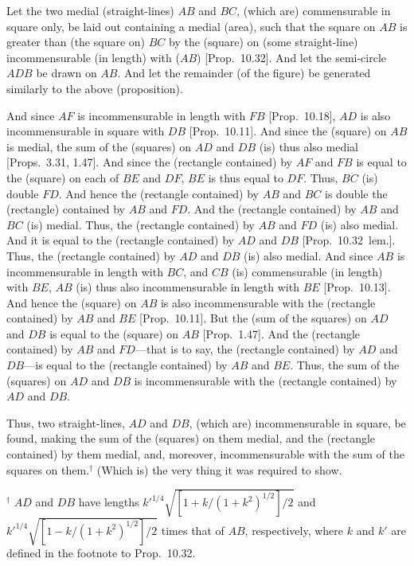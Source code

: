 \begin{Parallel}{}{}
{
\centerline{}

Let the two medial (straight-lines) $AB$ and $BC$, (which are) commensurable in square only, be laid out containing a medial (area), such
that the square on $AB$ is greater than (the square on) $BC$ by the
(square) on (some straight-line) incommensurable (in length) with ($AB$) [Prop.~10.32].  And let the semi-circle
$ADB$ be drawn on $AB$. And let the remainder (of the figure)
be generated similarly to the above (proposition).

And since $AF$ is incommensurable in length with $FB$ [Prop.~10.18], $AD$
is also incommensurable in square with $DB$ [Prop.~10.11]. And since the (square) on $AB$ is
medial, the sum of the (squares) on $AD$ and $DB$ (is) thus also
medial [Props.~3.31, 1.47]. And since the (rectangle
contained) by $AF$ and $FB$ is equal to the (square) on each of $BE$ and
$DF$, $BE$ is thus equal to $DF$. Thus, $BC$ (is) double $FD$. And
hence the (rectangle contained) by $AB$ and $BC$ is double the
(rectangle) contained by $AB$ and $FD$. And the (rectangle contained)
by $AB$ and $BC$ (is) medial. Thus, the (rectangle contained) by $AB$
and $FD$ (is) also medial. And it is equal to the (rectangle contained) 
by $AD$ and $DB$ [Prop.~10.32~lem.]. Thus, the
(rectangle contained) by $AD$ and $DB$ (is) also medial.
And since $AB$ is incommensurable in length with $BC$, and $CB$
(is) commensurable (in length) with $BE$, $AB$ (is) thus also incommensurable
in length with $BE$ [Prop.~10.13]. And hence the (square) on $AB$ is also incommensurable with the (rectangle contained) by $AB$ and $BE$ [Prop.~10.11]. But the (sum of the squares) on $AD$ and
$DB$ is equal to the (square) on $AB$ [Prop.~1.47].
And the (rectangle contained) by $AB$ and $FD$---that is to say, the (rectangle contained) by $AD$ and $DB$---is equal to the
(rectangle contained) by $AB$ and $BE$. Thus, the sum of the (squares) on
$AD$ and $DB$ is incommensurable with the (rectangle contained) by
$AD$ and $DB$.

Thus, two straight-lines, $AD$ and $DB$, (which are) incommensurable
in square, be found, making the sum of the (squares) on them
medial, and the (rectangle contained) by them medial, and, moreover, 
incommensurable  with the sum of the squares on them.$^\dag$
 (Which is) the
very thing it was required to show.}
\end{Parallel}
{\footnotesize\noindent$^\dag$ $AD$ and $DB$ have lengths
$k'^{1/4}\sqrt{[1+k/(1+k^2)^{1/2}]/2}$ and  $k'^{1/4}\sqrt{[1-k/(1+k^2)^{1/2}]/2}$ times that of $AB$, respectively, where $k$ and $k'$
are defined in the footnote to Prop.~10.32.}

